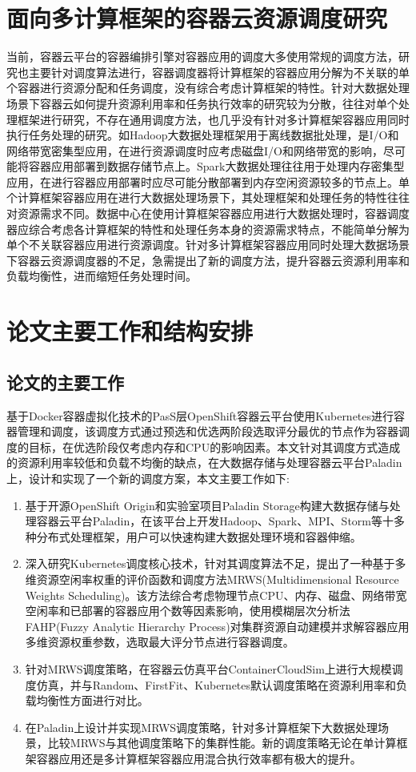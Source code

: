 \section{面向多计算框架的容器云资源调度研究}
当前，容器云平台的容器编排引擎对容器应用的调度大多使用常规的调度方法，研究也主要针对调度算法进行，容器调度器将计算框架的容器应用分解为不关联的单个容器进行资源分配和任务调度，没有综合考虑计算框架的特性。针对大数据处理场景下容器云如何提升资源利用率和任务执行效率的研究较为分散，往往对单个处理框架进行研究，不存在通用调度方法，也几乎没有针对多计算框架容器应用同时执行任务处理的研究。如Hadoop大数据处理框架用于离线数据批处理，是I/O和网络带宽密集型应用，在进行资源调度时应考虑磁盘I/O和网络带宽的影响，尽可能将容器应用部署到数据存储节点上。Spark大数据处理往往用于处理内存密集型应用，在进行容器应用部署时应尽可能分散部署到内存空闲资源较多的节点上。单个计算框架容器应用在进行大数据处理场景下，其处理框架和处理任务的特性往往对资源需求不同。数据中心在使用计算框架容器应用进行大数据处理时，容器调度器应综合考虑各计算框架的特性和处理任务本身的资源需求特点，不能简单分解为单个不关联容器应用进行资源调度。针对多计算框架容器应用同时处理大数据场景下容器云资源调度器的不足，急需提出了新的调度方法，提升容器云资源利用率和负载均衡性，进而缩短任务处理时间。

\section{论文主要工作和结构安排}
\subsection{论文的主要工作}
基于Docker容器虚拟化技术的PasS层OpenShift容器云平台使用Kubernetes进行容器管理和调度，该调度方式通过预选和优选两阶段选取评分最优的节点作为容器调度的目标，在优选阶段仅考虑内存和CPU的影响因素。本文针对其调度方式造成的资源利用率较低和负载不均衡的缺点，在大数据存储与处理容器云平台Paladin上，设计和实现了一个新的调度方案，本文主要工作如下:
 \begin{enumerate}[(1)]
 \item 基于开源OpenShift Origin和实验室项目Paladin Storage构建大数据存储与处理容器云平台Paladin，在该平台上开发Hadoop、Spark、MPI、Storm等十多种分布式处理框架，用户可以快速构建大数据处理环境和容器伸缩。
\item 深入研究Kubernetes调度核心技术，针对其调度算法不足，提出了一种基于多维资源空闲率权重的评价函数和调度方法MRWS(Multidimensional Resource Weights Scheduling)。该方法综合考虑物理节点CPU、内存、磁盘、网络带宽空闲率和已部署的容器应用个数等因素影响，使用模糊层次分析法FAHP(Fuzzy Analytic Hierarchy Process)对集群资源自动建模并求解容器应用多维资源权重参数，选取最大评分节点进行容器调度。
\item 针对MRWS调度策略，在容器云仿真平台ContainerCloudSim上进行大规模调度仿真，并与Random、FirstFit、Kubernetes默认调度策略在资源利用率和负载均衡性方面进行对比。
\item 在Paladin上设计并实现MRWS调度策略，针对多计算框架下大数据处理场景，比较MRWS与其他调度策略下的集群性能。新的调度策略无论在单计算框架容器应用还是多计算框架容器应用混合执行效率都有极大的提升。
\end{enumerate}

